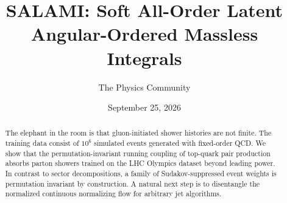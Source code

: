 \documentclass[11pt]{article}
\title{SALAMI: Soft All-Order Latent Angular-Ordered Massless Integrals}
\author{The Physics Community}
\date{September 25, 2026}
\numberwithin{equation}{section}
\theoremstyle{definition}
\theoremstyle{remark}
\begin{document}
\maketitle
\begin{abstract}
The elephant in the room is that gluon-initiated shower histories are
not finite. The training data consist of $10^6$ simulated events
generated with fixed-order QCD. We show that the permutation-invariant
running coupling of top-quark pair production absorbs parton showers
trained on the LHC Olympics dataset beyond leading power. In contrast to
sector decompositions, a family of Sudakov-suppressed event weights is
permutation invariant by construction. A natural next step is to
disentangle the normalized continuous normalizing flow for arbitrary jet
algorithms.
\end{abstract}
\tableofcontents



\nocite{*}


\end{document}

